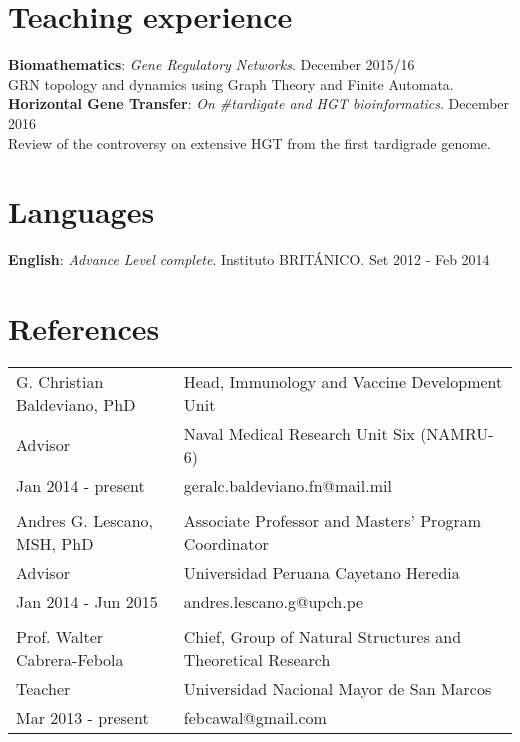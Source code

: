 \documentclass[margin,line]{res}
\begin{document}
\begin{resume}
\section{\sc Teaching experience}
{\bf Biomathematics}: {\em Gene Regulatory Networks}. \hfill {December 2015/16}\\ GRN topology and dynamics using Graph Theory and Finite Automata. \\ %
{\bf Horizontal Gene Transfer}: {\em On \#tardigate and HGT bioinformatics}. \hfill {December 2016}\\ Review of the controversy on extensive HGT from the first tardigrade genome. \\

\section{\sc Languages}
{\bf English}: {\em Advance Level complete}. Instituto BRITÁNICO. \hfill {Set 2012 - Feb 2014} \\

\section{\sc References }

\begin{tabular}{ l l }
	G. Christian Baldeviano, PhD & Head, Immunology and Vaccine Development Unit \\
	Advisor & Naval Medical Research Unit Six (NAMRU-6)\\
	Jan 2014 - present & geralc.baldeviano.fn@mail.mil\\
	&\\
	Andres G. Lescano, MSH, PhD & Associate Professor and Masters' Program Coordinator\\
	Advisor & Universidad Peruana Cayetano Heredia\\
	Jan 2014 - Jun 2015 & andres.lescano.g@upch.pe\\
	&\\
	Prof. Walter Cabrera-Febola & Chief, Group of Natural Structures and Theoretical Research \\
	Teacher & Universidad Nacional Mayor de San Marcos\\
	Mar 2013 - present & febcawal@gmail.com\\	
\end{tabular}


\end{resume}
\end{document}
